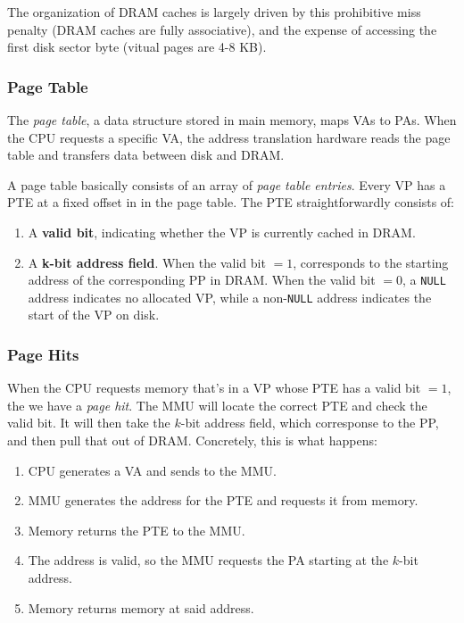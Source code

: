 \documentclass[fleqn]{article}
\begin{document}
The organization of DRAM caches is largely driven by this prohibitive miss penalty (DRAM caches are fully associative), and the expense of accessing the first disk sector byte (vitual pages are 4-8 KB).

\subsubsection{Page Table}

The \textit{page table}, a data structure stored in main memory, maps VAs to PAs. When the CPU requests a specific VA, the address translation hardware reads the page table and transfers data between disk and DRAM.

A page table basically consists of an array of \textit{page table entries}. Every VP has a PTE at a fixed offset in in the page table. The PTE straightforwardly consists of:

\begin{enumerate}
\item A \textbf{valid bit}, indicating whether the VP is currently cached in DRAM.

\item A \textbf{k-bit address field}. When the valid bit $=1$, corresponds to the starting address of the corresponding PP in DRAM. When the valid bit $=0$, a \texttt{NULL} address indicates no allocated VP, while a non-\texttt{NULL} address indicates the start of the VP on disk.
\end{enumerate}

\subsubsection{Page Hits}

When the CPU requests memory that's in a VP whose PTE has a valid bit $=1$, the we have a \textit{page hit}. The MMU will locate the correct PTE and check the valid bit. It will then take the $k$-bit address field, which corresponse to the PP, and then pull that out of DRAM. Concretely, this is what happens:

\begin{enumerate}
\item CPU generates a VA and sends to the MMU.

\item MMU generates the address for the PTE and requests it from memory.

\item Memory returns the PTE to the MMU.

\item The address is valid, so the MMU requests the PA starting at the $k$-bit address.

\item Memory returns memory at said address.
\end{enumerate}
\end{document}
